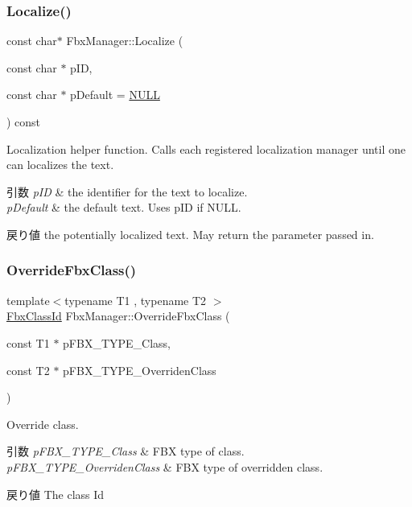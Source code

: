 \subsubsection{\texorpdfstring{Localize()}{Localize()}}
{\footnotesize\ttfamily const char$\ast$ Fbx\+Manager\+::\+Localize (\begin{DoxyParamCaption}\item[{const char $\ast$}]{p\+ID,  }\item[{const char $\ast$}]{p\+Default = {\ttfamily \hyperlink{fbxarch_8h_a070d2ce7b6bb7e5c05602aa8c308d0c4}{N\+U\+LL}} }\end{DoxyParamCaption}) const}

Localization helper function. Calls each registered localization manager until one can localizes the text. 
\begin{DoxyParams}{引数}
{\em p\+ID} & the identifier for the text to localize. \\
\hline
{\em p\+Default} & the default text. Uses p\+ID if N\+U\+LL. \\
\hline
\end{DoxyParams}
\begin{DoxyReturn}{戻り値}
the potentially localized text. May return the parameter passed in. 
\end{DoxyReturn}
\mbox{\label{class_fbx_manager_ab97e0e9c93a1f545ed814ece12bcad59}} 
\subsubsection{\texorpdfstring{Override\+Fbx\+Class()}{OverrideFbxClass()}}
{\footnotesize\ttfamily template$<$typename T1 , typename T2 $>$ \\
\hyperlink{class_fbx_class_id}{Fbx\+Class\+Id} Fbx\+Manager\+::\+Override\+Fbx\+Class (\begin{DoxyParamCaption}\item[{const T1 $\ast$}]{p\+F\+B\+X\+\_\+\+T\+Y\+P\+E\+\_\+\+Class,  }\item[{const T2 $\ast$}]{p\+F\+B\+X\+\_\+\+T\+Y\+P\+E\+\_\+\+Overriden\+Class }\end{DoxyParamCaption})}

Override class. 
\begin{DoxyParams}{引数}
{\em p\+F\+B\+X\+\_\+\+T\+Y\+P\+E\+\_\+\+Class} & F\+BX type of class. \\
\hline
{\em p\+F\+B\+X\+\_\+\+T\+Y\+P\+E\+\_\+\+Overriden\+Class} & F\+BX type of overridden class. \\
\hline
\end{DoxyParams}
\begin{DoxyReturn}{戻り値}
The class Id 
\end{DoxyReturn}
\mbox{\label{class_fbx_manager_ad4998934540803131a74f21041979826}} 

